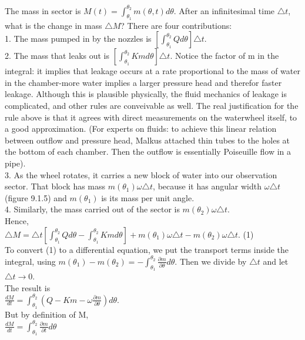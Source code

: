 \documentclass{article}
\newcommand\tab[1][1cm]{\hspace*{#1}}
\begin{document}
The mass in sector is $M(t)=\int_{\theta_{1}}^{\theta_{2}} m(\theta , t) d\theta.$ After an infinitesimal time $\triangle t$, what is the change in mass $\triangle M$? There are four contributions: \\ \tab \tab
1. The mass pumped in by the nozzles is $[\int_{\theta_{1}}^{\theta_{2}}Qd\theta]\triangle t$. \\ \tab \tab
2. The mass that leaks out is $[\int_{\theta_{1}}^{\theta_{2}}Km d\theta]\triangle t$. Notice the factor of m in the integral: it implies that leakage occurs at a rate proportional to the mass of water in the chamber-more water implies a larger pressure head and therefor faster leakage. Although this is plausible physically, the fluid mechanics of leakage is complicated, and other rules are conveivable as well. The real justification for the rule above is that it agrees with direct measurements on the waterwheel itself, to a good approximation. (For experts on fluids: to achieve this linear relation between outflow and pressure head, Malkus attached thin tubes to the holes at the bottom of each chamber. Then the outflow is essentially Poiseuille flow in a pipe). \\ \tab \tab
3. As the wheel rotates, it carries a new block of water into our observation sector. That block has mass $m(\theta_{1})\omega \triangle t$, because it has angular width $\omega \triangle t$ (figure 9.1.5) and $m(\theta_{1})$ is its mass per unit angle. \\ \tab \tab
4. Similarly, the mass carried out of the sector is $m (\theta_{2})\omega \triangle t$. \\
Hence, \\ \tab \tab
$\triangle M = \triangle t [\int_{\theta_{1}}^{\theta_{2}}Qd\theta - \int_{\theta_{1}}^{\theta_{2}}Km d\theta] + m(\theta_{1})\omega \triangle t - m(\theta_{2})\omega \triangle t$. \tab (1) \\
To convert (1) to a differential equation, we put the transport terms inside the integral, using $m(\theta_{1})-m(\theta_{2})=-\int_{\theta_{1}}^{\theta_{2}}\frac{\partial m}{\partial \theta}d\theta$. Then we divide by $\triangle t$ and let $\triangle t \to 0$. \\
The result is \\ \tab \tab
$\frac{dM}{dt}=\int_{\theta_{1}}^{\theta_{2}}(Q-Km-\omega \frac{\partial m}{\partial \theta}) d \theta$. \\
But by definition of M, \\ \tab \tab
$\frac{dM}{dt}=\int_{\theta_{1}}^{\theta_{2}}\frac{\partial m}{\partial t} d \theta$ \\
\end{document}
